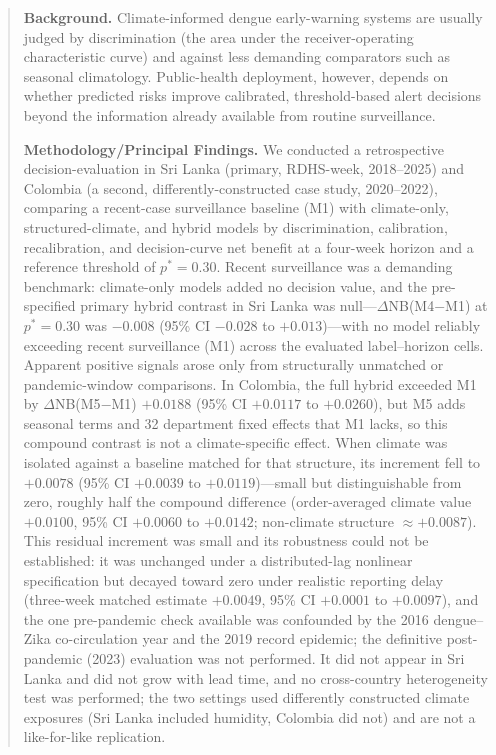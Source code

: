 \documentclass[11pt,a4paper]{article}
\begin{document}
\begin{abstract}
\noindent\textbf{Background.}
Climate-informed dengue early-warning systems are usually judged by discrimination (the area under the receiver-operating characteristic curve) and against less demanding comparators such as seasonal climatology. Public-health deployment, however, depends on whether predicted risks improve calibrated, threshold-based alert decisions beyond the information already available from routine surveillance.

\noindent\textbf{Methodology/Principal Findings.}
We conducted a retrospective decision-evaluation in Sri Lanka (primary, RDHS-week, 2018--2025) and Colombia (a second, differently-constructed case study, 2020--2022), comparing a recent-case surveillance baseline (M1) with climate-only, structured-climate, and hybrid models by discrimination, calibration, recalibration, and decision-curve net benefit at a four-week horizon and a reference threshold of $p^*=0.30$. Recent surveillance was a demanding benchmark: climate-only models added no decision value, and the pre-specified primary hybrid contrast in Sri Lanka was null---$\Delta$NB(M4$-$M1) at $p^*=0.30$ was $-0.008$ (95\% CI $-0.028$ to $+0.013$)---with no model reliably exceeding recent surveillance (M1) across the evaluated label--horizon cells. Apparent positive signals arose only from structurally unmatched or pandemic-window comparisons. In Colombia, the full hybrid exceeded M1 by $\Delta$NB(M5$-$M1) $+0.0188$ (95\% CI $+0.0117$ to $+0.0260$), but M5 adds seasonal terms and 32 department fixed effects that M1 lacks, so this compound contrast is not a climate-specific effect. When climate was isolated against a baseline matched for that structure, its increment fell to $+0.0078$ (95\% CI $+0.0039$ to $+0.0119$)---small but distinguishable from zero, roughly half the compound difference (order-averaged climate value $+0.0100$, 95\% CI $+0.0060$ to $+0.0142$; non-climate structure $\approx+0.0087$). This residual increment was small and its robustness could not be established: it was unchanged under a distributed-lag nonlinear specification but decayed toward zero under realistic reporting delay (three-week matched estimate $+0.0049$, 95\% CI $+0.0001$ to $+0.0097$), and the one pre-pandemic check available was confounded by the 2016 dengue--Zika co-circulation year and the 2019 record epidemic; the definitive post-pandemic (2023) evaluation was not performed. It did not appear in Sri Lanka and did not grow with lead time, and no cross-country heterogeneity test was performed; the two settings used differently constructed climate exposures (Sri Lanka included humidity, Colombia did not) and are not a like-for-like replication.


\end{abstract}
\end{document}
